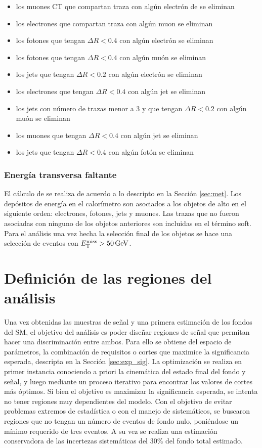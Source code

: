 \begin{itemize}
  \item los muones CT que compartan traza con algún electrón de se eliminan
  \item los electrones que compartan traza con algún muon se eliminan
  \item los fotones que tengan $\Delta R<0.4$ con algún electrón se eliminan
  \item los fotones que tengan $\Delta R<0.4$ con algún muón se eliminan
  \item los jets que tengan $\Delta R<0.2$ con algún electrón se eliminan
  \item los electrones que tengan $\Delta R<0.4$ con algún jet se eliminan
  \item los jets con número de trazas menor a 3 y que tengan $\Delta R<0.2$ con algún muón se eliminan
  \item los muones que tengan $\Delta R<0.4$ con algún jet se eliminan
  \item los jets que tengan $\Delta R<0.4$ con algún fotón se eliminan
\end{itemize}


\subsubsection{Energía transversa faltante}

El cálculo de \met se realiza de acuerdo a lo descripto en la Sección \ref{sec:met}. Los depósitos de energía en el calorímetro son asociados a los objetos de alto \pt en el siguiente orden: electrones, fotones, jets y muones. Las trazas que no fueron asociadas con ninguno de los objetos anteriores son incluidas en el término soft. Para el análisis una vez hecha la selección final de los objetos se hace una selección de eventos con $E_{\text{T}}^{\text{miss}}>50\,\text{GeV}$.


\section{Definición de las regiones del análisis}

Una vez obtenidas las muestras de señal y una primera estimación de los fondos del SM, el objetivo del análisis es poder diseñar regiones de señal que permitan hacer una discriminación entre ambos. Para ello se obtiene del espacio de parámetros, la combinación de requisitos o cortes que maximice la significancia esperada, descripta en la Sección \ref{sec:exp_sig}.
La optimización se realiza en primer instancia conociendo a priori la cinemática del estado final del fondo y señal, y luego mediante un proceso iterativo para encontrar los valores de cortes más óptimos. Si bien el objetivo es maximizar la significancia esperada, se intenta no tener regiones muy dependientes del modelo. Con el objetivo de evitar problemas extremos de estadística o con el manejo de sistemáticos, se buscaron regiones que no tengan un número de eventos de fondo nulo, poniéndose un mínimo requerido de tres eventos. A su vez se realiza una estimación conservadora de las incertezas sistemáticas del 30\% del fondo total estimado.

